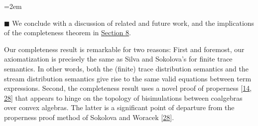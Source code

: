 \begin{list}{}{\leftmargin=2em}
\hypertarget{html:S1.I1.i7}{}
\item[]  %
\hypertarget{html:S1.I1.i7.m1}{}\({\blacksquare}\) %
\hypertarget{html:S1.I1.i7.p1}{} We conclude with a discussion of related and future work, and the implications of the completeness theorem in \hyperlink{html:S8}{Section 8}.
\par\medskip
  
 
\end{list}
\hypertarget{html:S1.p6}{} Our completeness result is remarkable for two reasons: First and foremost, our axiomatization is precisely the same as Silva and Sokolova’s for finite trace semantics. In other words, both the (finite) trace distribution semantics and the stream distribution semantics give rise to the same valid equations between term expressions. Second, the completeness result uses a novel proof of properness [\hyperlink{html:bib.bib14}{14}, \hyperlink{html:bib.bib28}{28}] that appears to hinge on the topology of bisimulations between coalgebras over convex algebras. The latter is a significant point of departure from the properness proof method of Sokolova and Woracek [\hyperlink{html:bib.bib28}{28}].
\par\medskip
  
